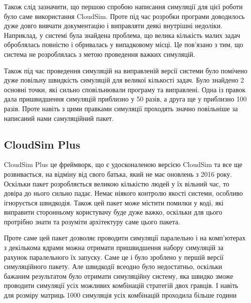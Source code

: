 Також слід зазначити, що першою спробою написання симуляції для цієї роботи було саме використання CloudSim. Проте під час розробки програми доводилось дуже довго вивчати документацію і виправляти деякі внутрішні недоліки. Наприклад, у системі була знайдена проблема, що велика кількість малих задач оброблялась повністю і обривалась у випадковому місці. Це пов'язано з тим, що система не розроблялась з метою проведення важких симуляцій.

Також під час проведення симуляцій на виправленій версії системи було помічено дуже повільну швидкість симуляцій для великої кількості задач. Було знайдено 2 основні точки, які сильно сповільнювали програму та виправлені. Одна із правок дала пришвидшення симуляцій приблизно у 50 разів, а друга ще у приблизно 100 разів. Проте навіть з цими правками симуляції проходять значно повільніше за написаний нами самуляційний пакет.

\subsection{CloudSim Plus}

CloudSim Plus \cite{CloudSimPlus} це фреймворк, що є удосконаленою версією CloudSim та все ще розвивається, на відміну від свого батька, який не має оновлень з 2016 року. Оскільки пакет розробляється великою кількістю людей у їх вільний час, то довіра до нього сильно падає. Немає ніякого контролю якості системи, особливо ігнорується швидкодія. Також цей пакет може містити помилки у коді, які виправити сторонньому користувачу буде дуже важко, оскільки для цього протрібно знати та розуміти архітектуру саме цього пакета.

Проте саме цей пакет дозволяє проводити симуляції паралельно і на комп'ютерах з декількома ядрами можна отримати пришвидшення набору симуляцій за рахунок паралельного їх запуску. Саме це і було зроблено у першій версії симуляційного пакету. Але швидкодії всеодно було недостатньо, оскільки бажаним результатом було отримати симуляційну систему, яка швидко зможе проводити симуляції усіх можливих комбінацій стратегій двох гравців. І навіть для розміру матриць 1000 симуляція усіх комбінацій проходила більше години